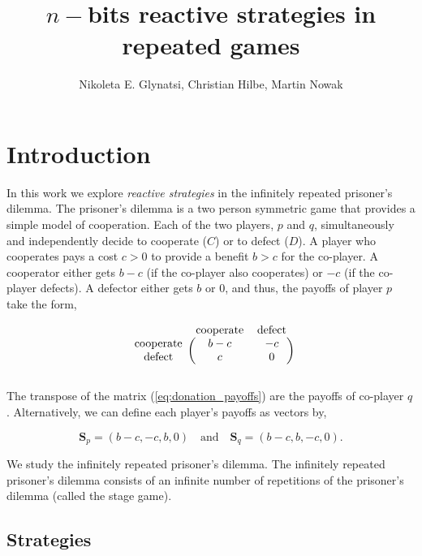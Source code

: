 \documentclass{article}
\title{$n-$bits reactive strategies in repeated games}
\author{Nikoleta E. Glynatsi, Christian Hilbe, Martin Nowak}
\date{}
\theoremstyle{definition}
\begin{document}
\maketitle

\section{Introduction}

In this work we explore \textit{reactive strategies} in the infinitely repeated
prisoner's dilemma. The prisoner's dilemma is a two person symmetric game that
provides a simple model of cooperation. Each of the two players, \(p\) and
\(q\), simultaneously and independently decide to cooperate (\(C\)) or to defect
(\(D\)). A player who cooperates pays a cost \(c > 0\) to provide a benefit
\(b > c\) for the co-player. A cooperator either gets \(b - c\) (if the
co-player also cooperates) or \(-c\) (if the co-player defects). A defector either gets
\(b\) or 0, and thus, the payoffs of player \(p\) take the form,

\begin{equation}\label{eq:donation_payoffs}
  \begin{blockarray}{ccc}
      & \text{cooperate} & \text{defect} \\
      \begin{block}{c(cc)}
          \text{cooperate} & b - c & -c \\
          \text{defect} & c & 0 \\
      \end{block}
  \end{blockarray}
\end{equation}

The transpose of the matrix (\ref{eq:donation_payoffs}) are the payoffs of
co-player \(q\). Alternatively, we can define each player's payoffs as vectors
by,

\begin{equation}\label{eq:vector_payoffs}
  \mathbf{S}_{p} = (b-c, -c, b, 0) \quad \textrm{and} \quad  \mathbf{S}_{q} = (b - c, b, -c, 0).
\end{equation}

We study the infinitely repeated prisoner's dilemma. The infinitely repeated
prisoner's dilemma consists of an infinite number of repetitions of the
prisoner's dilemma (called the stage game).

\subsection{Strategies}
\end{document}
